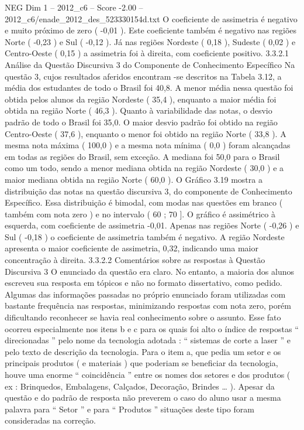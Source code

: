 \begin{textsample}{NEG Dim 1 – 2012\_c6 – Score -2.00 – 2012\_c6/enade\_2012\_des\_523330154d.txt}
O coeficiente de assimetria é negativo e muito próximo de zero ( -0,01 ).
Este coeficiente também é negativo nas regiões Norte ( -0,23 ) e Sul ( -0,12 ).
Já nas regiões Nordeste ( 0,18 ), Sudeste ( 0,02 ) e Centro-Oeste ( 0,15 ) a assimetria foi à direita, com coeficiente positivo. 3.3.2.1 Análise da Questão Discursiva 3 do Componente de Conhecimento Específico Na questão 3, cujos resultados aferidos encontram -se descritos na Tabela 3.12, a média dos estudantes de todo o Brasil foi 40,8.
A menor média nessa questão foi obtida pelos alunos da região Nordeste ( 35,4 ), enquanto a maior média foi obtida na região Norte ( 46,3 ).
Quanto à variabilidade das notas, o desvio padrão de todo o Brasil foi 35,0.
O maior desvio padrão foi obtido na região Centro-Oeste ( 37,6 ), enquanto o menor foi obtido na região Norte ( 33,8 ).
A mesma nota máxima ( 100,0 ) e a mesma nota mínima ( 0,0 ) foram alcançadas em todas as regiões do Brasil, sem exceção.
A mediana foi 50,0 para o Brasil como um todo, sendo a menor mediana obtida na região Nordeste ( 30,0 ) e a maior mediana obtida na região Norte ( 60,0 ).
O Gráfico 3.19 mostra a distribuição das notas na questão discursiva 3, do componente de Conhecimento Específico.
Essa distribuição é bimodal, com modas nas questões em branco ( também com nota zero ) e no intervalo ( 60 ; 70 ].
O gráfico é assimétrico à esquerda, com coeficiente de assimetria -0,01.
Apenas nas regiões Norte ( -0,26 ) e Sul ( -0,18 ) o coeficiente de assimetria também é negativo.
A região Nordeste apresenta o maior coeficiente de assimetria, 0,32, indicando uma maior concentração à direita. 3.3.2.2 Comentários sobre as respostas à Questão Discursiva 3 O enunciado da questão era claro.
No entanto, a maioria dos alunos escreveu sua resposta em tópicos e não no formato dissertativo, como pedido.
Algumas das informações passadas no próprio enunciado foram utilizadas com bastante frequência nas respostas, minimizando respostas com nota zero, porém dificultando reconhecer se havia real conhecimento sobre o assunto.
Esse fato ocorreu especialmente nos itens b e c para os quais foi alto o índice de respostas “ direcionadas ” pelo nome da tecnologia adotada : “ sistemas de corte a laser ” e pelo texto de descrição da tecnologia.
Para o item a, que pedia um setor e os principais produtos ( e materiais ) que poderiam se beneficiar da tecnologia, houve uma enorme “ coincidência ” entre os nomes dos setores e dos produtos ( ex : Brinquedos, Embalagens, Calçados, Decoração, Brindes … ).
Apesar da questão e do padrão de resposta não preverem o caso do aluno usar a mesma palavra para “ Setor ” e para “ Produtos ” situações deste tipo foram consideradas na correção.

\end{textsample}

